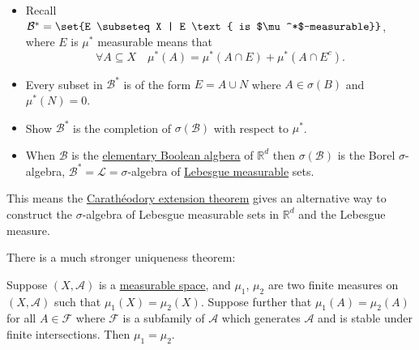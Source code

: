 \documentclass{article}
\newcommand{\1}[1]{\mathbbm{1}_{#1}}
\begin{document}
\begin{ex}\leavevmode
    \begin{itemize}
        \item Recall $\mathcal{B}^* = \set{E \subseteq X | E \text{ is $\mu^*$-measurable}}$, where $E$ is $\mu^*$ measurable means that
            \begin{equation*}
                \forall A \subseteq X \quad \mu^*(A) = \mu^*(A \cap E) + \mu^*(A \cap E^c).
            \end{equation*}
        \item Every subset in $\mathcal{B}^*$ is of the form $E = A \cup N$ where $A \in \sigma(B)$ and $\mu^*(N) = 0$.
        \item Show $\mathcal{B}^*$ is the completion of $\sigma(\mathcal{B})$ with respect to $\mu^*$.
        \item When $\mathcal{B}$ is the \hyperlink{def:elemBoolAlg}{elementary Boolean algbera} of $\mathbb{R}^d$ then $\sigma(\mathcal{B})$ is the Borel $\sigma$-algebra, $\mathcal{B}^* = \mathcal{L} = \sigma$-algebra of \hyperlink{def:lebMAble}{Lebesgue measurable} sets.
    \end{itemize}
\end{ex}
\begin{remark}
    This means the \hyperlink{thm:caratheodory}{Carath\'eodory extension theorem} gives an alternative way to construct the $\sigma$-algebra of Lebesgue measurable sets in $\mathbb{R}^d$ and the Lebesgue measure.
\end{remark}

There is a much stronger uniqueness theorem:
\begin{thm}
    Suppose $(X, \mathcal{A})$ is a \hyperlink{def:measurableSpace}{measurable space}, and $\mu_1$, $\mu_2$ are two finite measures on $(X, \mathcal{A})$ such that $\mu_1(X) = \mu_2(X)$.
    Suppose further that $\mu_1(A) = \mu_2(A)$ for all $A \in \mathcal{F}$ where $\mathcal{F}$ is a subfamily of $\mathcal{A}$ which generates $\mathcal{A}$ and is stable under finite intersections.
    Then $\mu_1 = \mu_2$.
\end{thm}

\end{document}
